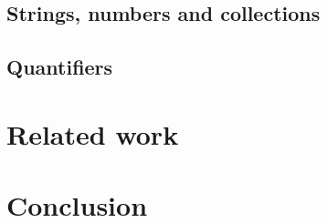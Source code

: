 \subsection{Strings, numbers and collections}

\subsection{Quantifiers}

\section{Related work}
\label{sec:relatedwork}


\section{Conclusion}

